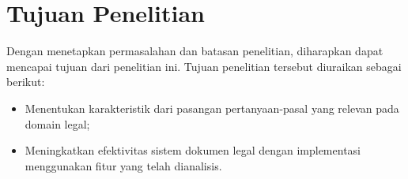 \section{Tujuan Penelitian}
\label{subbab:1:Tujuan Penelitian}
Dengan menetapkan permasalahan dan batasan penelitian, diharapkan dapat mencapai tujuan dari penelitian ini. Tujuan penelitian tersebut diuraikan sebagai berikut:
\begin{itemize} [topsep=0pt, itemsep=-1ex, partopsep=1ex, parsep=1ex]
    \item Menentukan karakteristik dari pasangan pertanyaan-pasal yang relevan pada domain legal;
    \item Meningkatkan efektivitas sistem \ir{} dokumen legal dengan implementasi \reranker{} menggunakan fitur yang telah dianalisis.
\end{itemize}





